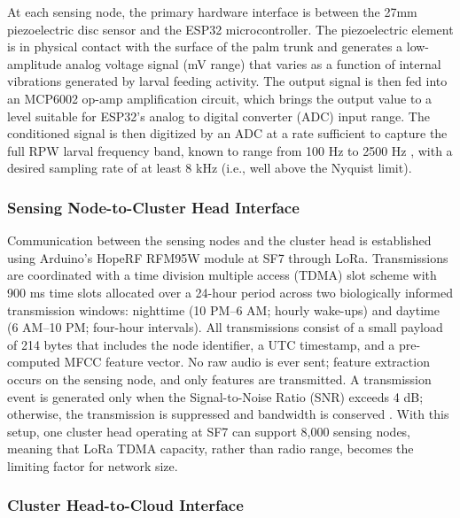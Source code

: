 \documentclass[12pt,a4paper,oneside]{memoir}
\begin{document}
At each sensing node, the primary hardware interface is between the 27mm piezoelectric disc sensor and the ESP32 microcontroller. The piezoelectric element is in physical contact with the surface of the palm trunk and generates a low-amplitude analog voltage signal (mV range) that varies as a function of internal vibrations generated by larval feeding activity. The output signal is then fed into an MCP6002 op-amp amplification circuit, which brings the output value to a level suitable for ESP32's analog to digital converter (ADC) input range. The conditioned signal is then digitized by an ADC at a rate sufficient to capture the full RPW larval frequency band, known to range from 100 Hz to 2500 Hz \cite{pinhas2008,rach2013}, with a desired sampling rate of at least 8 kHz (i.e., well above the Nyquist limit).
 
\subsubsection*{Sensing Node-to-Cluster Head Interface}
 
Communication between the sensing nodes and the cluster head is established using Arduino's HopeRF RFM95W module at SF7 through LoRa. Transmissions are coordinated with a time division multiple access (TDMA) slot scheme with 900 ms time slots allocated over a 24-hour period across two biologically informed transmission windows: nighttime (10 PM--6 AM; hourly wake-ups) and daytime (6 AM--10 PM; four-hour intervals). All transmissions consist of a small payload of 214 bytes that includes the node identifier, a UTC timestamp, and a pre-computed MFCC feature vector. No raw audio is ever sent; feature extraction occurs on the sensing node, and only features are transmitted. A transmission event is generated only when the Signal-to-Noise Ratio (SNR) exceeds 4 dB; otherwise, the transmission is suppressed and bandwidth is conserved \cite{wang2021}. With this setup, one cluster head operating at SF7 can support 8,000 sensing nodes, meaning that LoRa TDMA capacity, rather than radio range, becomes the limiting factor for network size.
 
\subsubsection*{Cluster Head-to-Cloud Interface}
 
\end{document}
